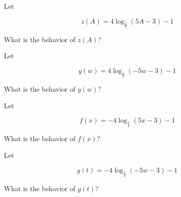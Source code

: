 \documentclass{ximera}
\author{Lee Wayand}
\begin{document}
\begin{exercise}


\begin{question}



Let 

\[
z(A) = 4 \log_{\tfrac{1}{2}}(5A - 3) - 1
\]


What is the behavior of $z(A)$? 


\begin{multipleChoice}
\end{multipleChoice}

\end{question}







\begin{question}



Let 

\[
y(w) = 4 \log_{\tfrac{1}{2}}(-5w - 3) - 1
\]


What is the behavior of $y(w)$? 


\begin{multipleChoice}
\end{multipleChoice}

\end{question}





\begin{question}



Let 

\[
f(x) = -4 \log_{\tfrac{1}{2}}(5x - 3) - 1
\]


What is the behavior of $f(x)$? 


\begin{multipleChoice}
\end{multipleChoice}

\end{question}








\begin{question}



Let 

\[
g(t) = -4 \log_{\tfrac{1}{2}}(-5w - 3) - 1
\]


What is the behavior of $g(t)$? 


\begin{multipleChoice}
\end{multipleChoice}

\end{question}








\end{exercise}
\end{document}
